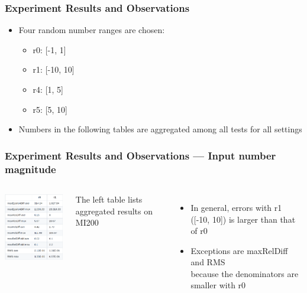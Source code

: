 \documentclass[t, pdftex, aspectratio=169]{beamer}  %
\begin{document}
\begin{frame}
  \frametitle{Experiment Results and Observations}

  \begin{itemize}
  \item Four random number ranges are chosen:
    \begin{itemize}
    \item r0: [-1, 1]
    \item r1: [-10, 10]
    \item r4: [1, 5]
    \item r5: [5, 10]
    \end{itemize}
  \item Numbers in the following tables are aggregated among all tests for all settings
  \end{itemize}
\end{frame}


\begin{frame}
  \frametitle{Experiment Results and Observations --- Input number magnitude}

  \begin{columns}

    \includegraphics[width=2in]{Input_magnitude}

    The left table lists aggregated results on MI200
    \begin{itemize}
    \item In general, errors with r1 ([-10, 10]) is larger than that of r0
    \item Exceptions are maxRelDiff and RMS\\
      because the denominators are smaller with r0
    \end{itemize}
  \end{columns}
\end{frame}
\end{document}
